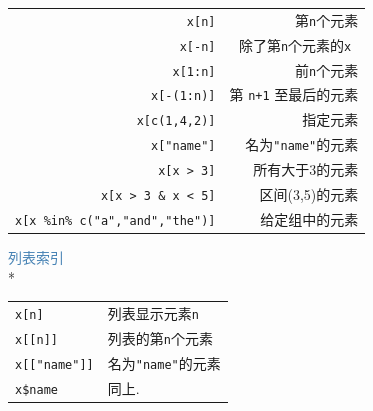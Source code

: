 \documentclass[landscape]{article}
\newcommand{\code}{\texttt}
\begin{document}
\begin{multicols*}{3}
\begin{tabular}{rr}
\code{x[n]} & 第\code{n}个元素\\
\code{x[-n]} & 除了第\code{n}个元素的\code{x}~\\
\code{x[1:n]} & 前\code{n}个元素\\
\code{x[-(1:n)]} & 第 \code{n+1} 至最后的元素\\
\code{x[c(1,4,2)]} & 指定元素\\
\code{x["name"]} & 名为\code{"name"}的元素\\
\code{x[x > 3]} & 所有大于3的元素\\
\code{x[x > 3 \& x < 5]} & 区间(3,5)的元素\\
\code{x[x \%in\% c("a","and","the")]} & 给定组中的元素\\
\end{tabular}

\textcolor{steelblue}{列表索引}\\*
\vspace{-3mm}

\begin{tabular}{@{}l@{\ }l}
\code{x[n]} & 列表显示元素\code{n}\\
\code{x[[n]]} & 列表的第\code{n}个元素\\
\code{x[["name"]]} & 名为\code{"name"}的元素\\
\code{x\$name} & 同上.\\
\end{tabular}


\end{multicols*}
\end{document}
